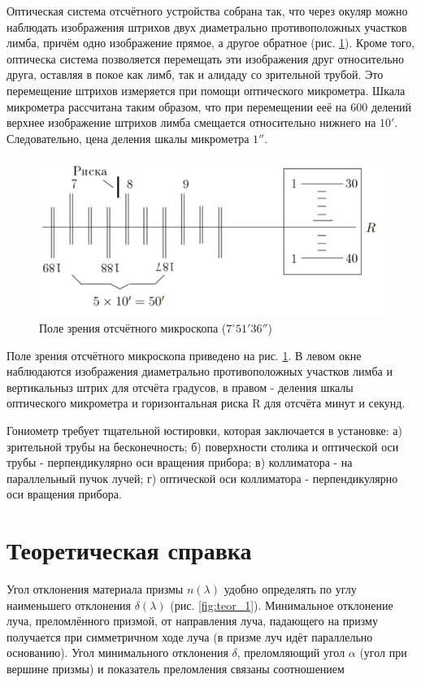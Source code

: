 \documentclass[a4paper, 12pt]{article}%
\begin{document}
Оптическая система отсчётного устройства собрана так, что через окуляр можно наблюдать изображения штрихов двух диаметрально противоположных участков лимба, причём одно изображение прямое, а другое обратное (рис. \ref{fig:scheme_3}). Кроме того, оптическа система позволяется перемещать эти изображения друг относительно друга, оставляя в покое как лимб, так и алидаду со зрительной трубой. Это перемещение штрихов измеряется при помощи оптического микрометра. Шкала микрометра рассчитана таким образом, что при перемещении ееё на 600 делений верхнее изображение штрихов лимба смещается относительно нижнего на $10'$. Следовательно, цена деления шкалы микрометра $1''$.

\begin{figure}
\includegraphics[scale=0.8]{images/scheme_3.png}
\caption{Поле зрения отсчётного микроскопа ($7^{\circ}51'36''$)}
\label{fig:scheme_3}
\end{figure}

Поле зрения отсчётного микроскопа приведено на рис. \ref{fig:scheme_3}. В левом окне наблюдаются изображения диаметрально противоположных участков лимба и вертикальныз штрих для отсчёта градусов, в правом - деления шкалы оптического микрометра и горизонтальная риска R для отсчёта минут и секунд.

Гониометр требует тщательной юстировки, которая заключается в установке: а) зрительной трубы на бесконечность; б) поверхности столика и оптической оси трубы - перпендикулярно оси вращения прибора; в) коллиматора - на параллельный пучок лучей; г) оптической оси коллиматора - перпендикулярно оси вращения прибора.

\section*{Теоретическая справка}

Угол отклонения материала призмы $n(\lambda )$ удобно определять по углу наименьшего отклонения $\delta (\lambda )$ (рис. \ref{fig:teor_1}). Минимальное отклонение луча, преломлённого призмой, от  направления луча, падающего на призму получается при симметричном ходе луча (в призме луч идёт параллельно основанию). Угол минимального отклонения $\delta$, преломляющий угол $\alpha$ (угол при вершине призмы) и показатель преломления связаны соотношением
\end{document}
